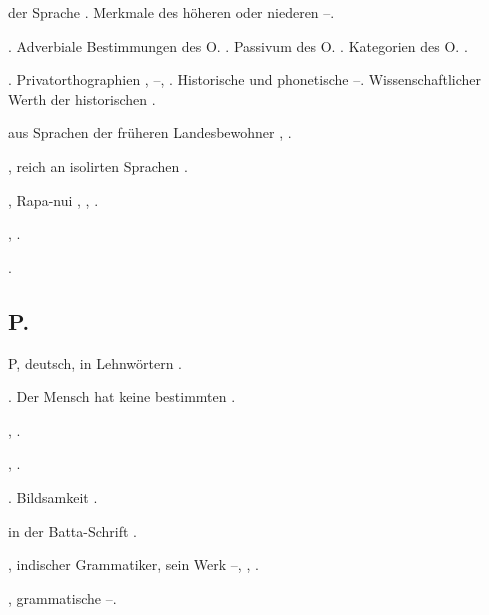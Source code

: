 \begin{register}
 der Sprache \pageref{sp.17}. Merkmale des höheren oder niederen \pageref{sp.389}–\pageref{sp.394}.

. Adverbiale Bestimmungen des O. \pageref{sp.101}. Passivum des O. \pageref{sp.102}. Kategorien des O. \pageref{sp.446}.

. Privatorthographien \pageref{sp.108}, \pageref{sp.115}–\pageref{sp.116}, \pageref{sp.133}. Historische und phonetische \pageref{sp.132}–\pageref{sp.133}. Wissenschaftlicher Werth der historischen \pageref{sp.175}.

 aus Sprachen der früheren Landesbewohner \pageref{sp.265}, \pageref{sp.286}.


, reich an isolirten Sprachen \pageref{sp.147}.

, Rapa-nui \pageref{sp.142}, \pageref{sp.147}, \pageref{sp.177}.


 \pageref{sp.257}, \pageref{sp.423}.

 \pageref{sp.163}.

\subsection*{P.}\label{reg.P}

P, deutsch, in Lehnwörtern \pageref{sp.186}.

. Der Mensch hat keine bestimmten \pageref{sp.306}.

,  \pageref{sp.157}.

 \pageref{sp.37}, \pageref{sp.201}.



. Bildsamkeit \pageref{sp.349}.


 in der Batta-Schrift \pageref{sp.131}.

, indischer Grammatiker, sein Werk \pageref{sp.22}–\pageref{sp.23}, \pageref{sp.111}, \pageref{sp.113}.


, grammatische \pageref{sp.116}–\pageref{sp.119}.


\end{register}
